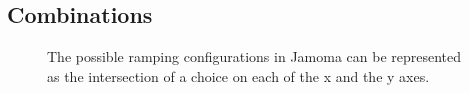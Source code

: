 \documentclass{article}
\begin{document}





\subsection{Combinations} %
\label{sec:combinations}

\begin{figure}
\centerline{}
\caption{The possible ramping configurations in Jamoma can be represented as the intersection of a choice on each of the x and the y axes.}
\label{fig:combinations}
\end{figure}
\end{document}
